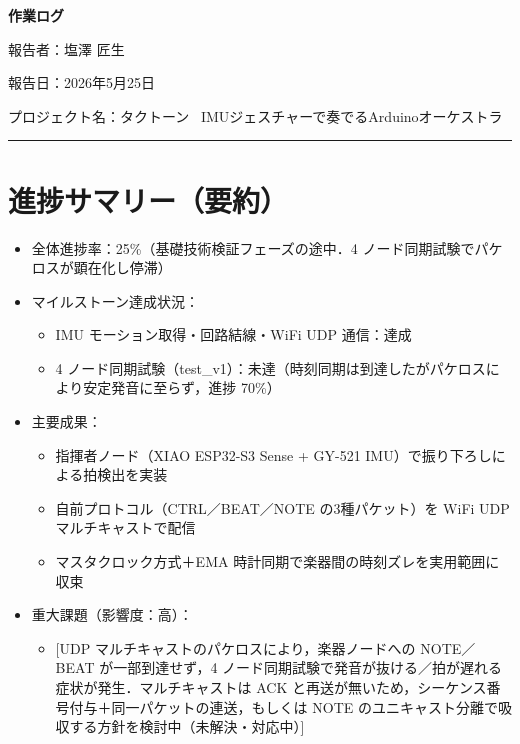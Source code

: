 \documentclass[uplatex,dvipdfmx,a4paper,11pt]{jsarticle}
\newcommand{\sectionrule}{\par\medskip\noindent\rule{\linewidth}{0.6pt}\par\medskip}
\begin{document}
{\LARGE\bfseries 作業ログ}\par\bigskip

報告者：塩澤 匠生

報告日：2026年5月25日

プロジェクト名：タクトーン~ IMUジェスチャーで奏でるArduinoオーケストラ~ \\

\sectionrule

\section{進捗サマリー（要約）}

\begin{itemize}
  \item 全体進捗率：25\%（基礎技術検証フェーズの途中．4 ノード同期試験でパケロスが顕在化し停滞）
  \item マイルストーン達成状況：
    \begin{itemize}
      \item IMU モーション取得・回路結線・WiFi UDP 通信：達成
      \item 4 ノード同期試験（test\_v1）：未達（時刻同期は到達したがパケロスにより安定発音に至らず，進捗 70\%）
    \end{itemize}
  \item 主要成果：
    \begin{itemize}
      \item 指揮者ノード（XIAO ESP32-S3 Sense + GY-521 IMU）で振り下ろしによる拍検出を実装
      \item 自前プロトコル（CTRL／BEAT／NOTE の3種パケット）を WiFi UDP マルチキャストで配信
      \item マスタクロック方式＋EMA 時計同期で楽器間の時刻ズレを実用範囲に収束
    \end{itemize}
  \item 重大課題（影響度：高）：
    \begin{itemize}
      \item {}[UDP マルチキャストのパケロスにより，楽器ノードへの NOTE／BEAT が一部到達せず，4 ノード同期試験で発音が抜ける／拍が遅れる症状が発生．マルチキャストは ACK と再送が無いため，シーケンス番号付与＋同一パケットの連送，もしくは NOTE のユニキャスト分離で吸収する方針を検討中（未解決・対応中）]
    \end{itemize}
\end{itemize}
\end{document}
